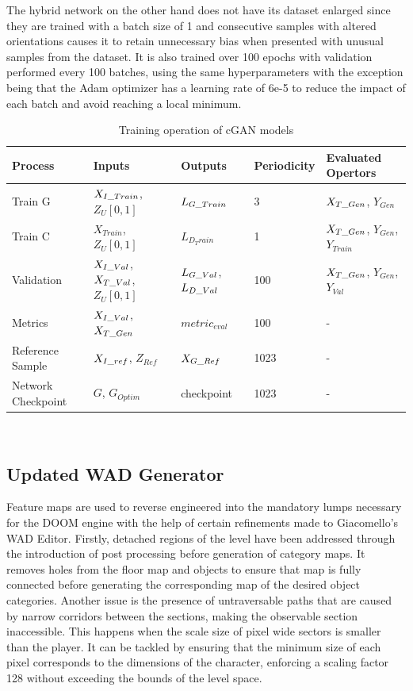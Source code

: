 \documentclass{Configuration_Files/PoliMi3i_thesis}
\begin{document}
The hybrid network on the other hand does not have its dataset enlarged since they 
are trained with a batch size of 1 and consecutive samples with altered orientations 
causes it to retain unnecessary bias when presented with unusual samples from the 
dataset. It is also trained over 100 epochs with validation performed every 100 
batches, using the same hyperparameters with the exception being that the Adam 
optimizer has a learning rate of 6e-5 to reduce the impact of each batch and avoid
reaching a local minimum.
\begin{table}[H]
\centering 
\begin{tabular}{ |C{2.5cm}|C{2.5cm}|C{2.5cm}|C{2.5cm}|C{2.5cm}|}
\hline
\textbf{Process} & \textbf{Inputs} & \textbf{Outputs} & \textbf{Periodicity} & \textbf{Evaluated Opertors} \\
\hline
Train G & $X_{I\char`_Train}$, $Z_{U}[0,1]$ & $L_{G\char`_Train}$ & 3 & $X_{T\char`_Gen}$, $Y_{Gen}$\\
\hline
Train C & $X_{Train}$, $Z_{U}[0,1]$ & $L_{D_Train}$ & 1 & $X_{T\char`_Gen}$, $Y_{Gen}$, $Y_{Train}$\\
\hline
Validation & $X_{I\char`_Val}$, $X_{T\char`_Val}$, $Z_{U}[0,1]$ & $L_{G\char`_Val}$, $L_{D\char`_Val}$ & 100 & $X_{T\char`_Gen}$, $Y_{Gen}$, $Y_{Val}$\\
\hline
Metrics & $X_{I\char`_Val}$, $X_{T\char`_Gen}$ & $metric_{eval}$ & 100 & -\\
\hline
Reference Sample & $X_{I\char`_ref}$, $Z_{Ref}$ & $X_{G\char`_Ref}$ & 1023 & -\\
\hline
Network Checkpoint & $G$, $G_{Optim}$ & checkpoint & 1023 & -\\
\hline
\end{tabular}
\\[10pt]
\caption{Training operation of cGAN models}
\label{table:cgantrain}
\end{table}

\subsection{Updated WAD Generator}
Feature maps are used to reverse engineered into the mandatory lumps necessary for
the DOOM engine with the help of certain refinements made to Giacomello’s WAD 
Editor. Firstly, detached regions of the level have been addressed through the 
introduction of post processing before generation of category maps. It removes holes 
from the floor map and objects to ensure that map is fully connected before 
generating the corresponding map of the desired object categories. Another issue is 
the presence of untraversable paths that are caused by narrow corridors between the 
sections, making the observable section inaccessible. This happens when the scale 
size of pixel wide sectors is smaller than the player. It can be tackled by ensuring that 
the minimum size of each pixel corresponds to the dimensions of the character, 
enforcing a scaling factor 128 without exceeding the bounds of the level space.
\end{document}
